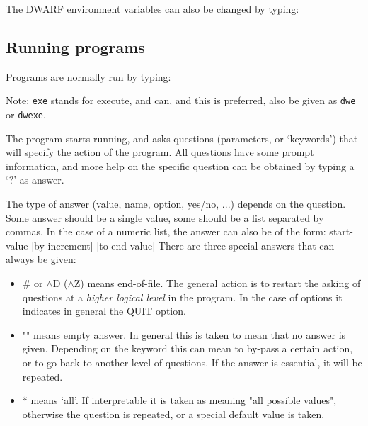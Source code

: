 The DWARF environment variables can also be changed by typing:


\subsection{Running programs}
\label{common.descr.dwarf-run}

Programs are normally run by typing: 


Note: {\tt exe} stands for execute, and can, and this is preferred, 
also be given as {\tt dwe} or {\tt dwexe}.

The program starts running, and asks questions (parameters, or `keywords') 
that will specify the action of
the program. All questions have some prompt information, and more help on the
specific question can be obtained by typing a `?' as answer. 

The type of answer (value, name, option, yes/no, ...) depends on the question.
Some answer should be a single value, some should be a list separated by commas.
In the case of a numeric list, the answer can also be of the form: start-value
[by increment] [to end-value]
There are three special answers that can always be given:

\begin{itemize}
\item	\# or $\wedge$D ($\wedge$Z) means end-of-file. 
			The general action is to restart the
                          asking of questions at a {\em higher logical level} 
			  in the
                          program. In the case of options it indicates in
                          general the QUIT option.
\item	"" means empty answer. In general this is taken to mean that no
                          answer is given. Depending on the keyword this can
                          mean to by-pass a certain action, or to go back to
                          another level of questions. If the answer is
                          essential, it will be repeated.
\item	* means `all'. If interpretable it is taken as meaning "all
                          possible values", otherwise the question is repeated,
                          or a special default value is taken.
\end{itemize}

